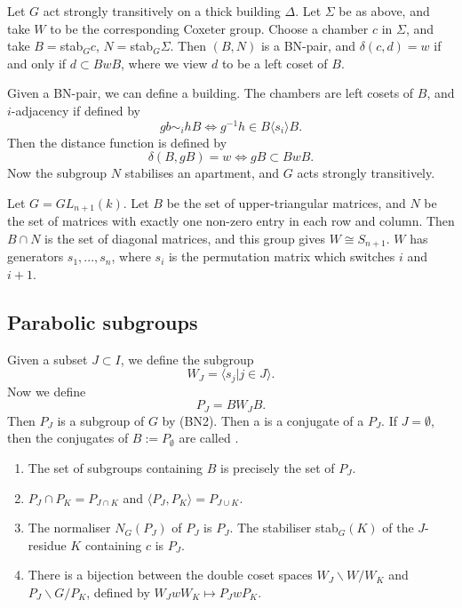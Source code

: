 \documentclass[11pt]{article}
\begin{document}
\begin{theorem}
    Let $G$ act strongly transitively on a thick building $\Delta$. Let $\Sigma$ be as above, and take $W$ to be the corresponding Coxeter group. Choose a chamber $c$ in $\Sigma$, and take $B=$stab$_Gc$, $N=$stab$_G\Sigma$. Then $(B,N)$ is a BN-pair, and $\delta(c,d)=w$ if and only if $d\subset BwB$, where we view $d$ to be a left coset of $B$. 
 \end{theorem}



\begin{theorem}
    Given a BN-pair, we can define a building. The chambers are left cosets of $B$, and $i$-adjacency if defined by 
    \[gb\sim_i hB \iff g^{-1}h\in B\langle  s_i\rangle B.  \]
    Then the distance function is defined by
    \[\delta(B,gB)=w\iff gB\subset BwB.\]
    Now the subgroup $N$ stabilises an apartment, and $G$ acts strongly transitively.
\end{theorem}


\begin{example}
Let $G=GL_{n+1}(k)$. Let $B$ be the set of upper-triangular matrices, and $N$ be the set of matrices with exactly one non-zero entry in each row and column. Then $B\cap N$ is the set of diagonal matrices, and this group gives $W\cong S_{n+1}$. $W$ has generators $s_1,...,s_n$, where $s_i$ is the permutation matrix which switches $i$ and $i+1$. 
\end{example}

\subsection{Parabolic subgroups}

\begin{definition}
    Given a subset $J\subset I$, we define the subgroup 
    \[W_J=\langle s_j|j\in J\rangle.\]
    Now we define 
    \[P_J=BW_JB.\]
    Then $P_J$ is a subgroup of $G$ by (BN2). Then a  is a conjugate of a $P_J$. If $J=\emptyset$, then the conjugates of $B:=P_\emptyset$ are called . 
\end{definition}

\begin{theorem}
    \begin{enumerate}
        \item The set of subgroups containing $B$ is precisely the set of $P_J$.
        \item $P_J\cap P_K=P_{J\cap K}$ and $\langle P_J,P_K\rangle=P_{J\cup K}$.
        \item The normaliser $N_G(P_J)$ of $P_J$ is $P_J$. The stabiliser stab$_G(K)$ of the $J$-residue $K$ containing $c$ is $P_J$. 
        \item There is a bijection between the double coset spaces $W_J\backslash W/W_K$ and $P_J\backslash G/P_K$, defined by $W_JwW_K\mapsto P_JwP_K$.
    \end{enumerate}
\end{theorem}
\end{document}
